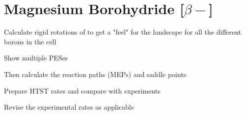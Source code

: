 \section{Magnesium Borohydride [$\beta-$]}
\label{sec:borohydrides-magnesium}

\bit
\item Calculate rigid rotations of  to get a "feel" for the landscape for all the different borons in the cell
\item Show multiple PESes
\item Then calculate the reaction paths (MEPs) and saddle points
\item Prepare HTST rates and compare with experiments
\item Revise the experimental rates as applicable
\eit

\placeholder
